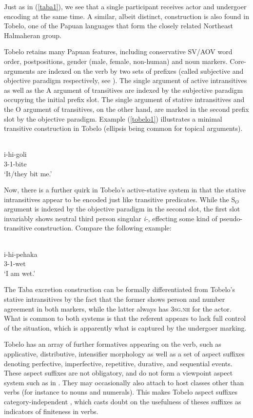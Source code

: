 Just as in (\ref{taba1}), we see that a single participant receives actor and undergoer encoding at the same time. A similar, albeit distinct, construction is also found in Tobelo, one of the Papuan languages that form the closely related Northeast Halmaheran group.

Tobelo retains many Papuan features, including conservative SV/AOV word order, postpositions, gender (male, female, non-human) and noun markers. Core-arguments are indexed on the verb by two sets of prefixes (called subjective and objective paradigm respectively, see \citealt[38]{holton2003tobelo}). The single argument of active intransitives as well as the A argument of transitives are indexed by the subjective paradigm occupying the initial prefix slot. The single argument of stative intransitives and the O argument of transitives, on the other hand, are marked in the second prefix slot by the objective paradigm. Example (\ref{tobelo1}) illustrates a minimal transitive construction in Tobelo (ellipsis being common for topical arguments).

\ea \label{tobelo1}
\\
\gll i-hi-goli \\
3-1-bite \\
\glft `It/they bit me.' 
\z

Now, there is a further quirk in Tobelo's active-stative system in that the stative intransitives appear to be encoded just like transitive predicates. While the S$_O$ argument is indexed by the objective paradigm in the second slot, the first slot invariably shows neutral third person singular \textit{i-}, effecting some kind of pseudo-transitive construction. Compare the following example:

\ea 
{}\\
\gll i-hi-pehaka \\
3-1-wet \\
\glft `I am wet.'
\z

The Taba excretion construction can be formally differentiated from Tobelo's stative intransitives by the fact that the former shows person and number agreement in both markers, while the latter always has \textsc{3sg.nh} for the actor. What is common to both systems is that the referent appears to lack full control of the situation, which is apparently what is captured by the undergoer marking.

Tobelo has an array of further formatives appearing on the verb, such as applicative, distributive, intensifier morphology as well as a set of aspect suffixes denoting perfective, imperfective, repetitive, durative, and sequential events. These aspect suffixes are not obligatory, and do not form a viewpoint aspect system such as in . They may occasionally also attach to host classes other than verbs (for instance to nouns and numerals). This makes Tobelo aspect suffixes category-independent \citep[44]{holton2003tobelo}, which casts doubt on the usefulness of theses suffixes as indicators of finiteness in verbs. 

